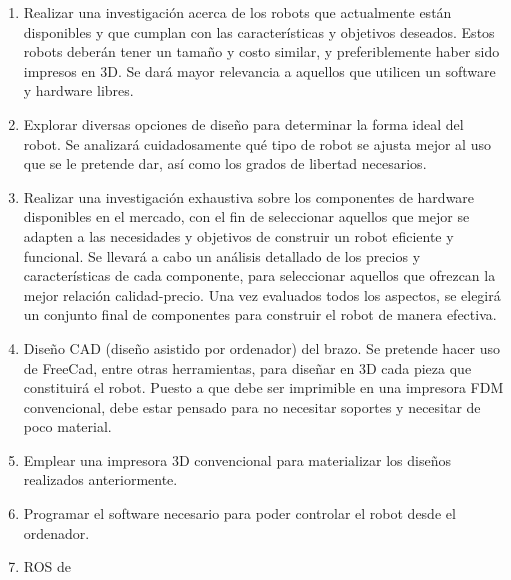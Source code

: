 \begin{enumerate}
    \item Realizar una investigación acerca de los robots que actualmente están disponibles y que cumplan con 
          las características y objetivos deseados. Estos robots deberán tener un tamaño y costo similar, y 
          preferiblemente haber sido impresos en 3D. Se dará mayor relevancia a aquellos que utilicen un software y hardware 
          libres.
    \item Explorar diversas opciones de diseño para determinar la forma ideal del robot. Se analizará cuidadosamente 
          qué tipo de robot se ajusta mejor al uso que se le pretende dar, así como los grados de libertad necesarios. 
            
    \item Realizar una investigación exhaustiva sobre los componentes de hardware disponibles en el mercado, con el fin de seleccionar 
          aquellos que mejor se adapten a las necesidades y objetivos de construir un robot eficiente y funcional. Se llevará 
          a cabo un análisis detallado de los precios y características de cada componente, para seleccionar aquellos 
          que ofrezcan la mejor relación calidad-precio. Una vez evaluados todos los aspectos, se elegirá un conjunto 
          final de componentes para construir el robot de manera efectiva. 
    
    \item Diseño CAD (diseño asistido por ordenador) del brazo. Se pretende hacer uso de FreeCad, entre otras herramientas, para
          diseñar en 3D cada pieza que constituirá el robot. Puesto a que debe ser imprimible en una impresora FDM convencional,
          debe estar pensado para no necesitar soportes y necesitar de poco material.
    \item Emplear una impresora 3D convencional para materializar los diseños realizados anteriormente.
    \item Programar el software necesario para poder controlar el robot desde el ordenador.
    \item ROS de 

  
\end{enumerate}\


